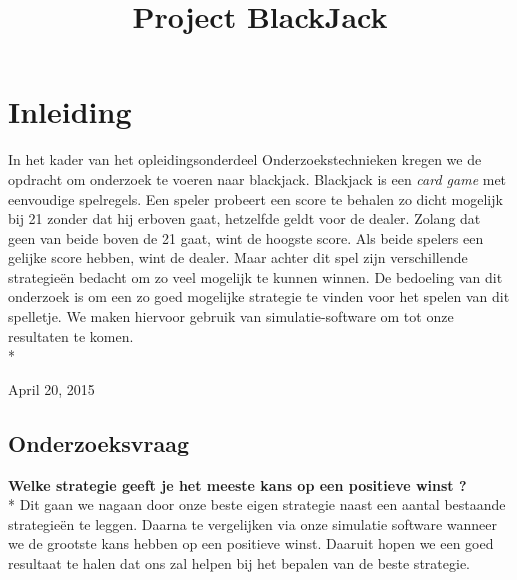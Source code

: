 \documentclass[conference]{IEEEtran}
\begin{document}
\title{Project BlackJack}
\author{
}
\maketitle

\IEEEpeerreviewmaketitle

\section{Inleiding}
In het kader van het opleidingsonderdeel Onderzoekstechnieken kregen we de opdracht om onderzoek te voeren naar blackjack. Blackjack is een {\it card game} met eenvoudige spelregels. Een speler probeert een score te behalen zo dicht mogelijk bij 21 zonder dat hij erboven gaat, hetzelfde geldt voor de dealer. Zolang dat geen van beide boven de 21 gaat, wint de hoogste score. Als beide spelers een gelijke score hebben, wint de dealer.
Maar achter dit spel zijn verschillende strategie\"en bedacht om zo veel mogelijk te kunnen winnen. De bedoeling van dit onderzoek is om een zo goed mogelijke strategie te vinden voor het spelen van dit spelletje. We maken hiervoor gebruik van simulatie-software om tot onze resultaten te komen.\\*
 
\hfill April 20, 2015

\subsection{Onderzoeksvraag}
\textbf{Welke strategie geeft je het meeste kans op een positieve winst ?}\\*
Dit gaan we nagaan door onze beste eigen strategie naast een aantal bestaande strategie\"en te leggen.
Daarna te vergelijken via onze simulatie software wanneer we de grootste kans hebben op een positieve winst. Daaruit hopen we een goed resultaat te halen dat ons zal helpen bij het bepalen van de beste strategie.
\end{document}
